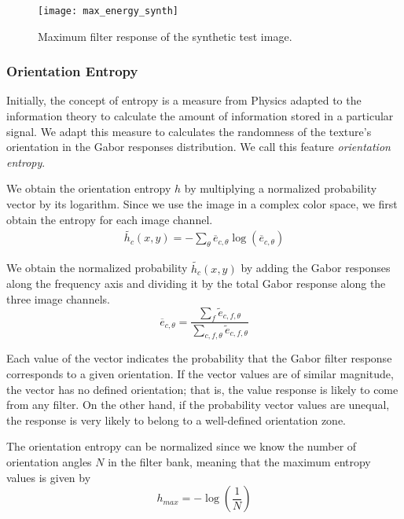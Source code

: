 \begin{figure}[!ht]
	\texttt{[image: max\_energy\_synth]}
    \caption{Maximum filter response of the synthetic test image.}
    \label{fig:max_energy_synth}
\end{figure}

\subsubsection{Orientation Entropy}
Initially, the concept of entropy is a measure from Physics adapted to the information theory to calculate the amount of information stored in a particular signal. We adapt this measure to calculates the randomness of the texture's orientation in the Gabor responses distribution.  We call this feature \textit{orientation entropy}.

We obtain the orientation entropy $h$ by multiplying a normalized probability vector by its logarithm. Since we use the image in a complex color space, we first obtain the entropy for each image channel.
\begin{gather}
    \widetilde{h_c}(x,y) = -\sum_{\theta} \overline{e}_{c, \theta} \log (\overline{e}_{c, \theta}) \label{eq:entropy_orient_ch}
\end{gather}

We obtain the normalized probability $\widetilde{h_c}(x,y)$ by adding the Gabor responses along the frequency axis and dividing it by the total Gabor response along the three image channels.
\begin{equation}
	\overline{e}_{c, \theta} =  \frac{\sum_f \widetilde{e}_{c, f, \theta}}{\sum_{c, f, \theta}\widetilde{e}_{c, f, \theta} }  \label{eq:gabor_energy_ch_orient_prob}
\end{equation}

Each value of the vector indicates the probability that the Gabor filter response corresponds to a given orientation. If the vector values are of similar magnitude, the vector has no defined orientation; that is, the value response is likely to come from any filter. On the other hand, if the probability vector values are unequal, the response is very likely to belong to a well-defined orientation zone.

The orientation entropy can be normalized since we know the number of orientation angles $N$ in the filter bank, meaning that the maximum entropy values is given by 
\begin{equation}
    h_{max} = -\log\left(\frac{1}{N}\right) \label{eq:max_entropy_orient} 
\end{equation}

